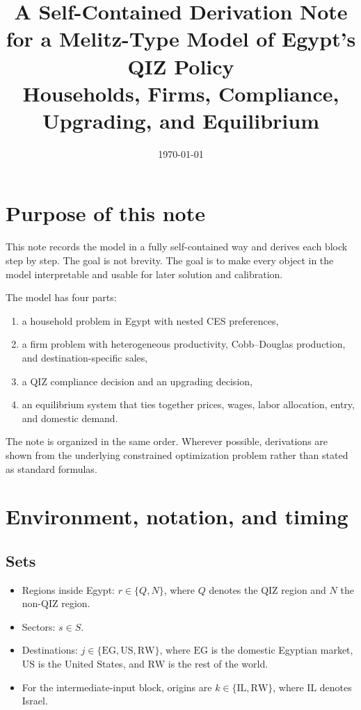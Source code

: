 \documentclass[11pt]{article}
\title{A Self-Contained Derivation Note for a Melitz-Type Model of Egypt's QIZ Policy\\Households, Firms, Compliance, Upgrading, and Equilibrium}
\author{}
\date{\today}
\begin{document}
\maketitle
\tableofcontents
\newpage

\section{Purpose of this note}

This note records the model in a fully self-contained way and derives each block step by step. The goal is not brevity. The goal is to make every object in the model interpretable and usable for later solution and calibration.

The model has four parts:
\begin{enumerate}[leftmargin=*]
    \item a household problem in Egypt with nested CES preferences,
    \item a firm problem with heterogeneous productivity, Cobb--Douglas production, and destination-specific sales,
    \item a QIZ compliance decision and an upgrading decision,
    \item an equilibrium system that ties together prices, wages, labor allocation, entry, and domestic demand.
\end{enumerate}

The note is organized in the same order. Wherever possible, derivations are shown from the underlying constrained optimization problem rather than stated as standard formulas.

\section{Environment, notation, and timing}

\subsection{Sets}

\begin{itemize}[leftmargin=*]
    \item Regions inside Egypt: \(r \in \{Q,N\}\), where \(Q\) denotes the QIZ region and \(N\) the non-QIZ region.
    \item Sectors: \(s \in S\).
    \item Destinations: \(j \in \{\mathrm{EG},\mathrm{US},\mathrm{RW}\}\), where \(\mathrm{EG}\) is the domestic Egyptian market, \(\mathrm{US}\) is the United States, and \(\mathrm{RW}\) is the rest of the world.
    \item For the intermediate-input block, origins are \(k \in \{\mathrm{IL},\mathrm{RW}\}\), where \(\mathrm{IL}\) denotes Israel.
\end{itemize}
\end{document}
